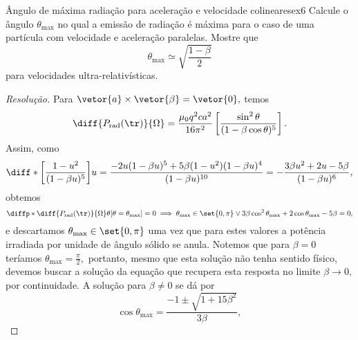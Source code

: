 \begin{exercício}{Ângulo de máxima radiação para aceleração e velocidade colineares}{ex6}
    Calcule o ângulo \(\theta_\mathrm{max}\) no qual a emissão de radiação é máxima para o caso de uma partícula com velocidade e aceleração paralelas. Mostre que 
    \begin{equation*}
        \theta_\mathrm{max} \simeq \sqrt{\frac{1 - \beta}{2}}
    \end{equation*}
    para velocidades ultra-relativísticas.
\end{exercício}
\begin{proof}[Resolução]
    Para \(\vetor{a} \times \vetor{\beta} = \vetor{0},\) temos
    \begin{equation*}
        \diff{P_{\mathrm{rad}}(\tr)}{\Omega} = \frac{\mu_0 q^2 c a^2}{16 \pi^2}\left[\frac{\sin^2\theta}{(1 - \beta \cos\theta)^5}\right].
    \end{equation*}
    Assim, como
    \begin{equation*}
        \diff*{\left[\frac{1 - u^2}{(1 - \beta u)^5}\right]}{u} = \frac{-2u (1 - \beta u)^5 + 5 \beta(1 - u^2) (1 - \beta u)^4}{(1 - \beta u)^{10}} = -\frac{3 \beta u^2 + 2u - 5 \beta}{(1 - \beta u)^6},
    \end{equation*}
    obtemos
    \begin{equation*}
        \diffp*{\diff{P_\mathrm{rad}(\tr)}{\Omega}}{\theta}[\theta = \theta_{\mathrm{max}}] = 0 \implies \theta_{\mathrm{max}} \in \set{0,\pi} \lor 3 \beta \cos^2\theta_{\mathrm{max}} + 2\cos\theta_{\mathrm{max}} - 5 \beta = 0,
    \end{equation*}
    e descartamos \(\theta_{\mathrm{max}} \in \set{0, \pi}\) uma vez que para estes valores a potência irradiada por unidade de ângulo sólido se anula. Notemos que para \(\beta = 0\) teríamos \(\theta_{\mathrm{max}} = \frac{\pi}{2},\) portanto, mesmo que esta solução não tenha sentido físico, devemos buscar a solução da equação que recupera esta resposta no limite \(\beta \to 0,\) por continuidade. A solução para \(\beta \neq 0\) se dá por
    \begin{equation*}
        \cos\theta_{\mathrm{max}} = \frac{-1 \pm \sqrt{1 + 15 \beta^2}}{3\beta},
    \end{equation*}

\end{proof}
